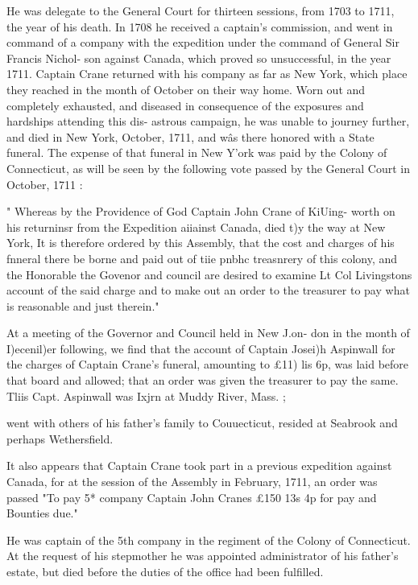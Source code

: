 He was delegate to the General Court for thirteen sessions, 
from 1703 to 1711, the year of his death. In 1708 he received a 
captain's commission, and went in command of a company with 
the expedition under the command of General Sir Francis Nichol- 
son against Canada, which proved so unsuccessful, in the year 
1711. Captain Crane returned with his company as far as New 
York, which place they reached in the month of October on their 
way home. Worn out and completely exhausted, and diseased 
in consequence of the exposures and hardships attending this dis- 
astrous campaign, he was unable to journey further, and died in 
New York, October, 1711, and w\^as there honored with a State 
funeral. The expense of that funeral in New Y'ork was paid by 
the Colony of Connecticut, as will be seen by the following vote 
passed by the General Court in October, 1711 : 

" Whereas by the Providence of God Captain John Crane of KiUing- 
worth on his returninsr from the Expedition aiiainst Canada, died t)y the 
way at New York, It is therefore ordered by this Assembly, that the 
cost and charges of his fnneral there be borne and paid out of tiie pnbhc 
treasnrery of this colony, and the Honorable the Govenor and council 
are desired to examine Lt Col Livingstons account of the said charge 
and to make out an order to the treasurer to pay what is reasonable and 
just therein." 

At a meeting of the Governor and Council held in New J.on- 
don in the month of I)ecenil)er following, we find that the account 
of Captain Josei)h Aspinwall for the charges of Captain Crane's 
funeral, amounting to £11)  lis  6p, was laid before that board 
and allowed; that an order was given the treasurer to pay the 
same. Tliis Capt. Aspinwall was Ixjrn at Muddy River, Mass. ; 




went with others of his father's family to Couuecticut, resided at 
Seabrook and perhaps Wethersfield. 

It also appears that Captain Crane took part in a previous 
expedition against Canada, for at the session of the Assembly in 
February, 1711, an order was passed "To pay 5* company 
Captain John Cranes £150  13s  4p for pay and Bounties due." 

He was captain of the 5th company in the regiment of the 
Colony of Connecticut. At the request of his stepmother he was 
appointed administrator of his father's estate, but died before the 
duties of the office had been fulfilled. 

